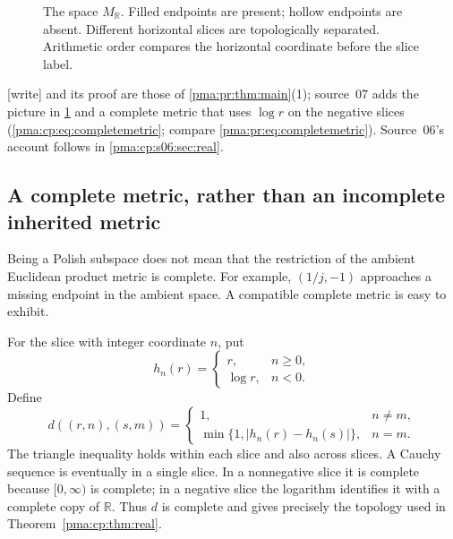 \documentclass[11pt]{article}
\numberwithin{equation}{section}
\theoremstyle{definition}
\theoremstyle{remark}
\newcommand{\Z}{\mathbb Z}
\newcommand{\R}{\mathbb R}
\newcommand{\writetag}{\textup{\textsf{\small[write]}}}
\begin{document}
\begin{figure}[ht]
\centering
{}
\caption{The space $M_{\R}$. Filled endpoints are present; hollow endpoints
are absent. Different horizontal slices are topologically separated.
Arithmetic order compares the horizontal coordinate before the slice label.}
\label{pma:cp:fig:real}
\end{figure}

\noindent\writetag{}  and its proof are those of
\cref{pma:pr:thm:main}(1); source~07 adds the picture in \cref{pma:cp:fig:real}
and a complete metric that uses $\log r$ on the negative slices
(\cref{pma:cp:eq:completemetric}; compare \eqref{pma:pr:eq:completemetric}).
Source~06's account follows in \cref{pma:cp:s06:sec:real}.

\subsection{A complete metric, rather than an incomplete inherited metric}

Being a Polish subspace does not mean that the restriction of the ambient
Euclidean product metric is complete. For example, $(1/j,-1)$ approaches a
missing endpoint in the ambient space. A compatible complete metric is easy
to exhibit.

For the slice with integer coordinate $n$, put
\[
h_n(r)=
\begin{cases}
r,&n\geq0,\\
\log r,&n<0.
\end{cases}
\]
Define
\begin{equation}
\label{pma:cp:eq:completemetric}
d((r,n),(s,m))=
\begin{cases}
1,&n\ne m,\\
\min\{1,|h_n(r)-h_n(s)|\},&n=m.
\end{cases}
\end{equation}
The triangle inequality holds within each slice and also across slices.
A Cauchy sequence is eventually in a single slice. In a nonnegative slice
it is complete because $[0,\infty)$ is complete; in a negative slice the
logarithm identifies it with a complete copy of $\R$. Thus $d$ is complete
and gives precisely the topology used in Theorem~\ref{pma:cp:thm:real}.
\end{document}
